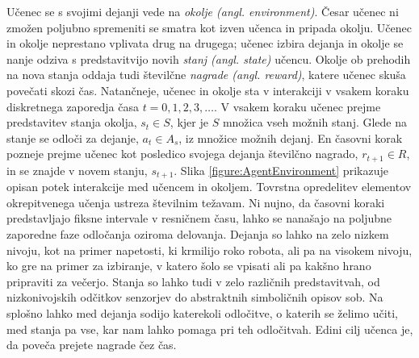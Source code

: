 \documentclass[a4paper, oneside, 12pt]{report}
\begin{document}
Učenec se s svojimi dejanji vede na {\em okolje (angl. environment)}. Česar učenec ni zmožen poljubno spremeniti se smatra kot izven učenca in pripada okolju. Učenec in okolje neprestano vplivata drug na drugega; učenec izbira dejanja in okolje se nanje odziva s predstavitvijo novih {\em stanj (angl. state)} učencu. Okolje ob prehodih na nova stanja oddaja tudi številčne {\em nagrade (angl. reward)}, katere učenec skuša povečati skozi čas. Natančneje, učenec in okolje sta v interakciji v vsakem koraku diskretnega zaporedja časa $t = 0, 1, 2, 3, \dots$. V vsakem koraku učenec prejme predstavitev stanja okolja, $s_t \in S$, kjer je $S$ množica vseh možnih stanj. Glede na stanje se odloči za dejanje, $a_t \in A_s$, iz množice možnih dejanj. En časovni korak pozneje prejme učenec kot posledico svojega dejanja številčno nagrado, $r_{t+1} \in R$, in se znajde v novem stanju, $s_{t+1}$. Slika \ref{figure:AgentEnvironment} prikazuje opisan potek interakcije med učencem in okoljem. Tovrstna opredelitev elementov okrepitvenega učenja ustreza številnim težavam. Ni nujno, da časovni koraki predstavljajo fiksne intervale v resničnem času, lahko se nanašajo na poljubne zaporedne faze odločanja oziroma delovanja. Dejanja so lahko na zelo nizkem nivoju, kot na primer napetosti, ki krmilijo roko robota, ali pa na visokem nivoju, ko gre na primer za izbiranje, v katero šolo se vpisati ali pa kakšno hrano pripraviti za večerjo. Stanja so lahko tudi v zelo različnih predstavitvah, od nizkonivojskih odčitkov senzorjev do abstraktnih simboličnih opisov sob. Na splošno lahko med dejanja sodijo katerekoli odločitve, o katerih se želimo učiti, med stanja pa vse, kar nam lahko pomaga pri teh odločitvah. Edini cilj učenca je, da poveča prejete nagrade čez čas.
\end{document}
